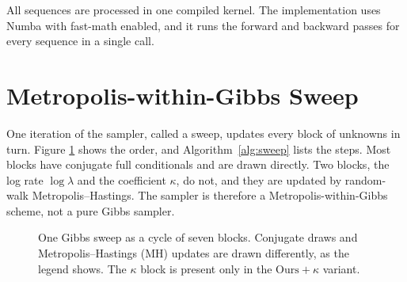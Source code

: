 All sequences are processed in one compiled kernel. The implementation uses Numba
\cite{lam2015numba} with fast-math enabled, and it runs the forward and backward passes for every
sequence in a single call. 

\section{Metropolis-within-Gibbs Sweep}
\label{sec:method-sweep}

One iteration of the sampler, called a sweep, updates every block of unknowns in turn. Figure
\ref{fig:tk_gibbs_flow} shows the order, and Algorithm~\ref{alg:sweep} lists the steps. Most blocks
have conjugate full conditionals and are drawn directly. Two blocks, the log rate $\log\lambda$ and
the coefficient $\kappa$, do not, and they are updated by random-walk Metropolis--Hastings. The
sampler is therefore a Metropolis-within-Gibbs scheme, not a pure Gibbs sampler.

\begin{figure}[htbp]
  \centering
  
  \caption{One Gibbs sweep as a cycle of seven blocks. Conjugate draws and Metropolis--Hastings
    (MH) updates are drawn differently, as the legend shows. The $\kappa$ block is present only in
    the $\text{Ours}+\kappa$ variant.}
  \label{fig:tk_gibbs_flow}
\end{figure}

